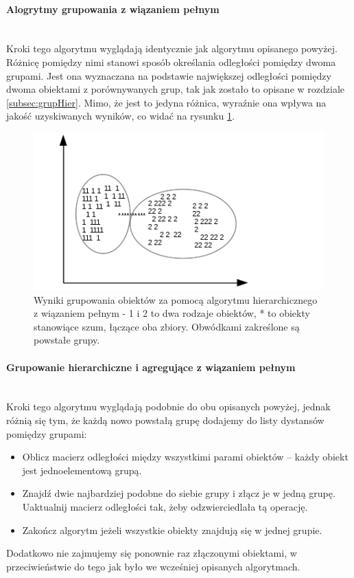\documentclass{article}
\newcommand{\myparagraph}[1]{\paragraph{#1}\mbox{}\\}
\begin{document}
\myparagraph{Alogrytmy grupowania z wiązaniem pełnym}

Kroki tego algorytmu wyglądają identycznie jak algorytmu opisanego powyżej. Różnicę pomiędzy nimi stanowi sposób określania odległości pomiędzy dwoma grupami. Jest ona wyznaczana na podstawie największej odległości pomiędzy dwoma obiektami z porównywanych grup, tak jak zostało to opisane w rozdziale \ref{subsec:grupHier}. Mimo, że jest to jedyna różnica, wyraźnie ona wpływa na jakość uzyskiwanych wyników, co widać na rysunku \ref{fig:grupHChain}.

\begin{figure} 
	\centering
	\includegraphics[]{grupHChain.png}
	\caption{Wyniki grupowania obiektów za pomocą algorytmu hierarchicznego z wiązaniem pełnym - 1 i 2 to dwa rodzaje obiektów, * to obiekty stanowiące szum, łączące oba zbiory. Obwódkami zakreślone są powstałe grupy.}
	\label{fig:grupHChain}
\end{figure}

\myparagraph{Grupowanie hierarchiczne i agregujące z wiązaniem pełnym}

Kroki tego algorytmu wyglądają podobnie do obu opisanych powyżej, jednak różnią się tym, że każdą nowo powstałą grupę dodajemy do listy dystansów pomiędzy grupami:
\begin{itemize}
	\item Oblicz macierz odległości między wszystkimi parami obiektów – każdy obiekt jest jednoelementową grupą.
	\item Znajdź dwie najbardziej podobne do siebie grupy i złącz je w jedną grupę. Uaktualnij macierz odległości tak, żeby odzwierciedlała tą operację.
	\item Zakończ algorytm jeżeli wszystkie obiekty znajdują się w jednej grupie.
\end{itemize}

Dodatkowo nie zajmujemy się ponownie raz złączonymi obiektami, w przeciwieństwie do tego jak było we wcześniej opisanych algorytmach.
\end{document}
